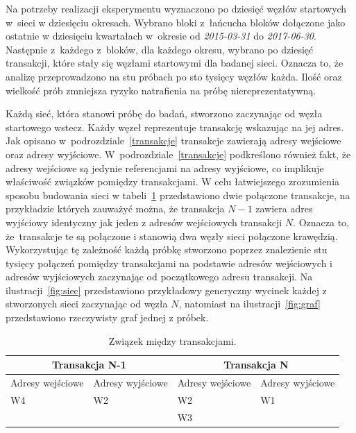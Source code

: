 \documentclass[12pt, twoside, final, openany]{mgr}
\begin{document}
\indent Na potrzeby realizacji eksperymentu wyznaczono po dziesięć węzłów startowych w~sieci w dziesięciu okresach. Wybrano bloki z~łańcucha bloków dołączone jako ostatnie w dziesięciu kwartałach w~okresie od \textit{2015-03-31} do \textit{2017-06-30}. Następnie z~każdego z~bloków, dla każdego okresu, wybrano po dziesięć transakcji, które stały się węzłami startowymi dla badanej sieci. Oznacza to, że analizę przeprowadzono na stu próbach po sto tysięcy węzłów każda. Ilość oraz wielkość prób zmniejsza ryzyko natrafienia na próbę niereprezentatywną.

\indent Każdą sieć, która stanowi próbę do badań, stworzono zaczynając od węzła startowego wstecz. Każdy węzeł reprezentuje transakcję wskazując na jej adres. Jak opisano w~podrozdziale~\ref{transakcje} transakcje zawierają adresy wejściowe oraz adresy wyjściowe. W~podrozdziale~\ref{transakcje} podkreślono również fakt, że adresy wejściowe są jedynie referencjami na adresy wyjściowe, co implikuje właściwość związków pomiędzy transakcjami. W celu łatwiejszego zrozumienia sposobu budowania sieci w tabeli~\ref{tab:zwiazekTransakcji} przedstawiono dwie połączone transakcje, na przykładzie których zauważyć można, że transakcja $N-1$ zawiera adres wyjściowy identyczny jak jeden z adresów wejściowych transakcji $N$. Oznacza to, że~transakcje te są połączone i stanowią dwa węzły sieci połączone krawędzią. Wykorzystując tę zależność każdą próbkę stworzono poprzez znalezienie stu tysięcy połączeń pomiędzy transakcjami na podstawie adresów wejściowych i adresów wyjściowych zaczynając od początkowego adresu transakcji. Na ilustracji~\ref{fig:siec} przedstawiono przykładowy generyczny wycinek każdej z stworzonych sieci zaczynając od węzła $N$, natomiast na ilustracji~\ref{fig:graf} przedstawiono rzeczywisty graf jednej z próbek. 

\begin{table}[H]
\begin{center}
\caption{Związek między transakcjami.}
\label{tab:zwiazekTransakcji}
\begin{tabular}{|l|l|l|l|}
\hline
	\multicolumn{2}{|c|}{Transakcja N-1} 
   &\multicolumn{2}{|c|}{Transakcja N}  \\
\hline
Adresy wejściowe & Adresy wyjściowe &Adresy wejściowe & Adresy wyjściowe\\
\hline
W4 & W2 & W2 & W1 \\
&& W3 & \\
\hline 
\end{tabular}
\end{center}
\end{table}
\end{document}
